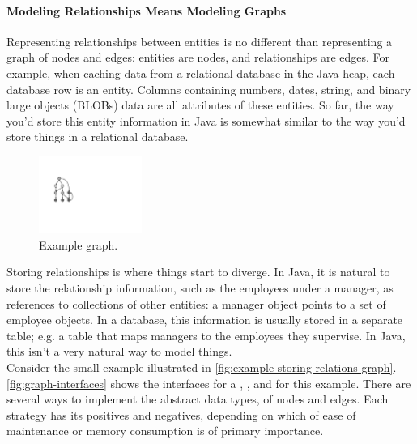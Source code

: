 \paragraph{Modeling Relationships Means Modeling Graphs}
Representing relationships between entities is no different than representing a
graph of nodes and edges: entities are nodes, and relationships are edges. For
example, when caching data from a relational database in the Java heap, each
database row is an entity. Columns containing numbers, dates, string,
and binary large objects (BLOBs) data are all attributes of these entities. So
far, the way you'd store this entity information in Java is somewhat similar to
the way you'd store things in a relational database. 

\begin{figure}
    \centering
	\includegraphics[width=0.3\textwidth]{part3/Figures/assessing/exampleGraph}
	\caption{Example graph.}
    \label{fig:example-storing-relations-graph}
\end{figure}
Storing relationships is where things start to diverge. 
In
Java, it is natural to store the relationship information, such as the employees
under a manager, as references to collections of
other entities: a manager object points to a set of employee objects.
In a database, this information is usually
stored in a separate table; e.g. a table that maps managers to the employees
they supervise. In Java, this isn't a very natural way to model things.
\\ \indent %
Consider the small example illustrated in \autoref{fig:example-storing-relations-graph}.
\autoref{fig:graph-interfaces} shows the interfaces for a
, , and  for this
example. There are several ways to implement the abstract data types, of nodes
and edges. Each strategy has its positives and negatives, depending on which of ease of
maintenance or memory consumption is of primary importance.

